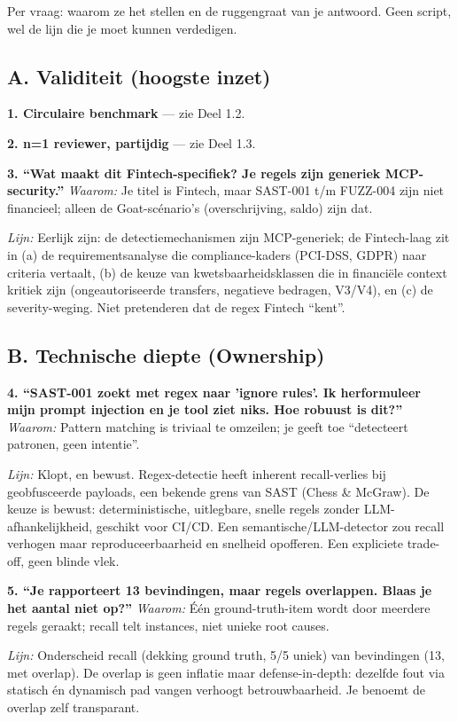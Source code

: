 \documentclass[11pt,a4paper]{article}
\newcommand{\waarom}[1]{{\color{hggrey}\textit{Waarom:} #1}\par}
\newcommand{\lijn}[1]{\textit{Lijn:} #1\par}
\begin{document}
Per vraag: waarom ze het stellen en de ruggengraat van je antwoord. Geen script,
wel de lijn die je moet kunnen verdedigen.

\subsection{A. Validiteit (hoogste inzet)}

\textbf{1. Circulaire benchmark} \;--- zie Deel 1.2.

\textbf{2. n=1 reviewer, partijdig} \;--- zie Deel 1.3.

\textbf{3. ``Wat maakt dit Fintech-specifiek? Je regels zijn generiek MCP-security.''}
\waarom{Je titel is Fintech, maar SAST-001 t/m FUZZ-004 zijn niet financieel; alleen de Goat-sc\'enario's (overschrijving, saldo) zijn dat.}
\lijn{Eerlijk zijn: de detectiemechanismen zijn MCP-generiek; de Fintech-laag zit in (a) de requirementsanalyse die compliance-kaders (PCI-DSS, GDPR) naar criteria vertaalt, (b) de keuze van kwetsbaarheidsklassen die in financi\"ele context kritiek zijn (ongeautoriseerde transfers, negatieve bedragen, V3/V4), en (c) de severity-weging. Niet pretenderen dat de regex Fintech ``kent''.}

\subsection{B. Technische diepte (Ownership)}

\textbf{4. ``SAST-001 zoekt met regex naar 'ignore rules'. Ik herformuleer mijn prompt injection en je tool ziet niks. Hoe robuust is dit?''}
\waarom{Pattern matching is triviaal te omzeilen; je geeft toe ``detecteert patronen, geen intentie''.}
\lijn{Klopt, en bewust. Regex-detectie heeft inherent recall-verlies bij geobfusceerde payloads, een bekende grens van SAST (Chess \& McGraw). De keuze is bewust: deterministische, uitlegbare, snelle regels zonder LLM-afhankelijkheid, geschikt voor CI/CD. Een semantische/LLM-detector zou recall verhogen maar reproduceerbaarheid en snelheid opofferen. Een expliciete trade-off, geen blinde vlek.}

\textbf{5. ``Je rapporteert 13 bevindingen, maar regels overlappen. Blaas je het aantal niet op?''}
\waarom{\'E\'en ground-truth-item wordt door meerdere regels geraakt; recall telt instances, niet unieke root causes.}
\lijn{Onderscheid recall (dekking ground truth, 5/5 uniek) van bevindingen (13, met overlap). De overlap is geen inflatie maar defense-in-depth: dezelfde fout via statisch \'en dynamisch pad vangen verhoogt betrouwbaarheid. Je benoemt de overlap zelf transparant.}
\end{document}
